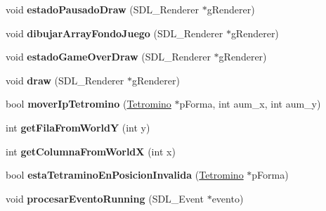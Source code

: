 \begin{DoxyCompactItemize}
\item 
void {\bfseries estado\+Pausado\+Draw} (S\+D\+L\+\_\+\+Renderer $\ast$g\+Renderer)\hypertarget{class_tetris_juego_af297d5c8cd519d573e7dfac417142998}{}\label{class_tetris_juego_af297d5c8cd519d573e7dfac417142998}

\item 
void {\bfseries dibujar\+Array\+Fondo\+Juego} (S\+D\+L\+\_\+\+Renderer $\ast$g\+Renderer)\hypertarget{class_tetris_juego_af061d000c7ab4e29adfda86cdecbe475}{}\label{class_tetris_juego_af061d000c7ab4e29adfda86cdecbe475}

\item 
void {\bfseries estado\+Game\+Over\+Draw} (S\+D\+L\+\_\+\+Renderer $\ast$g\+Renderer)\hypertarget{class_tetris_juego_aeacf6dd012795333a742decabce249c2}{}\label{class_tetris_juego_aeacf6dd012795333a742decabce249c2}

\item 
void {\bfseries draw} (S\+D\+L\+\_\+\+Renderer $\ast$g\+Renderer)\hypertarget{class_tetris_juego_ab4b0666883b9fde99319cf320357c784}{}\label{class_tetris_juego_ab4b0666883b9fde99319cf320357c784}

\item 
bool {\bfseries mover\+Ip\+Tetromino} (\hyperlink{class_tetromino}{Tetromino} $\ast$p\+Forma, int aum\+\_\+x, int aum\+\_\+y)\hypertarget{class_tetris_juego_a35bdb56d4a31143fc656345c4a3e006a}{}\label{class_tetris_juego_a35bdb56d4a31143fc656345c4a3e006a}

\item 
int {\bfseries get\+Fila\+From\+WorldY} (int y)\hypertarget{class_tetris_juego_ad07328fec7ad800547fec8197b61e7a4}{}\label{class_tetris_juego_ad07328fec7ad800547fec8197b61e7a4}

\item 
int {\bfseries get\+Columna\+From\+WorldX} (int x)\hypertarget{class_tetris_juego_a82da039b63b4a053e036ef5d0ee3ecaa}{}\label{class_tetris_juego_a82da039b63b4a053e036ef5d0ee3ecaa}

\item 
bool {\bfseries esta\+Tetramino\+En\+Posicion\+Invalida} (\hyperlink{class_tetromino}{Tetromino} $\ast$p\+Forma)\hypertarget{class_tetris_juego_adb79eebdcea86c8b52cc3e35dbc6c96f}{}\label{class_tetris_juego_adb79eebdcea86c8b52cc3e35dbc6c96f}

\item 
void {\bfseries procesar\+Evento\+Running} (S\+D\+L\+\_\+\+Event $\ast$evento)\hypertarget{class_tetris_juego_a0a0d2eab2797f180e3afd6ce03ebee43}{}\label{class_tetris_juego_a0a0d2eab2797f180e3afd6ce03ebee43}


\end{DoxyCompactItemize}
